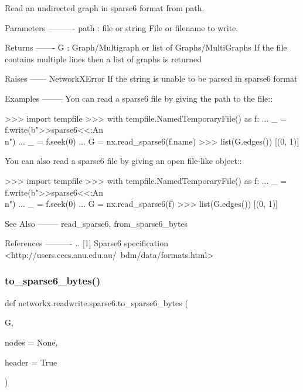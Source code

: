 \begin{DoxyVerb}Read an undirected graph in sparse6 format from path.

Parameters
----------
path : file or string
   File or filename to write.

Returns
-------
G : Graph/Multigraph or list of Graphs/MultiGraphs
   If the file contains multiple lines then a list of graphs is returned

Raises
------
NetworkXError
    If the string is unable to be parsed in sparse6 format

Examples
--------
You can read a sparse6 file by giving the path to the file::

    >>> import tempfile
    >>> with tempfile.NamedTemporaryFile() as f:
    ...     _ = f.write(b">>sparse6<<:An\\n")
    ...     _ = f.seek(0)
    ...     G = nx.read_sparse6(f.name)
    >>> list(G.edges())
    [(0, 1)]

You can also read a sparse6 file by giving an open file-like object::

    >>> import tempfile
    >>> with tempfile.NamedTemporaryFile() as f:
    ...     _ = f.write(b">>sparse6<<:An\\n")
    ...     _ = f.seek(0)
    ...     G = nx.read_sparse6(f)
    >>> list(G.edges())
    [(0, 1)]

See Also
--------
read_sparse6, from_sparse6_bytes

References
----------
.. [1] Sparse6 specification
       <http://users.cecs.anu.edu.au/~bdm/data/formats.html>\end{DoxyVerb}
 \mbox{\label{namespacenetworkx_1_1readwrite_1_1sparse6_ab8c3216ab381d1860445bb547037a4c4}} 
\subsubsection{\texorpdfstring{to\+\_\+sparse6\+\_\+bytes()}{to\_sparse6\_bytes()}}
{\footnotesize\ttfamily def networkx.\+readwrite.\+sparse6.\+to\+\_\+sparse6\+\_\+bytes (\begin{DoxyParamCaption}\item[{}]{G,  }\item[{}]{nodes = {\ttfamily None},  }\item[{}]{header = {\ttfamily True} }\end{DoxyParamCaption})}

